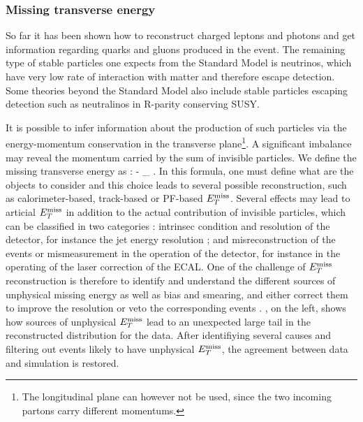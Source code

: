             \subsubsection{Missing transverse energy}

        So far it has been shown how to reconstruct charged leptons and photons and get
        information regarding quarks and gluons produced in the event. The remaining
        type of stable particles one expects from the Standard Model is neutrinos, which
        have very low rate of interaction with matter and therefore escape detection. Some
        theories beyond the Standard Model also include stable particles escaping detection
        such as neutralinos in R-parity conserving SUSY.

        It is possible to infer information about the production
        of such particles via the energy-momentum conservation in the transverse plane\footnote{The
        longitudinal plane can however not be used, since the two incoming partons carry
        different momentums.}. A significant imbalance may reveal the momentum carried by
        the sum of invisible particles. We define the missing transverse energy as :
        {
            \MET {} - \sum_{} \vec{\pT}.
        }
        In this formula, one must define what are the objects to consider and this choice
        leads to several possible reconstruction, such as calorimeter-based, track-based
        or PF-based $E_T^\text{miss}$. Several effects may lead to articial $E_T^\text{miss}$ in addition to the
        actual contribution of invisible particles, which can be classified in two categories :
        intrinsec condition and resolution of the detector, for instance the jet energy
        resolution ; and misreconstruction of the events or mismeasurement in the
        operation of the detector, for instance in the operating of the laser correction
        of the ECAL. One of the challenge of $E_T^\text{miss}$ reconstruction is therefore to identify
        and understand the different sources of unphysical missing energy as well as bias and
        smearing, and either correct them to improve the resolution or veto the corresponding
        events
        .
        , on the left, shows how sources of unphysical $E_T^\text{miss}$
        lead to an unexpected large tail in the reconstructed distribution for the data.
        After identifiying several causes and filtering out events likely to have unphysical
        $E_T^\text{miss}$, the agreement between data and simulation is restored.

